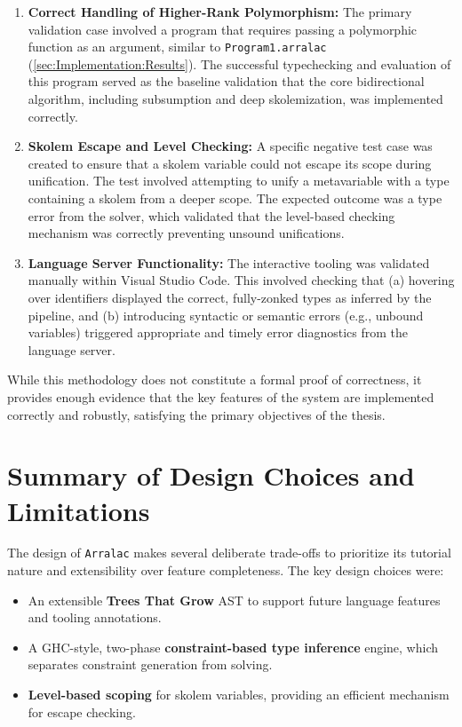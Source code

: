 \begin{enumerate}
    \item \textbf{Correct Handling of Higher-Rank Polymorphism:} The primary validation case involved a program that requires passing a polymorphic function as an argument, similar to \texttt{Program1.arralac} (\cref{sec:Implementation:Results}). The successful typechecking and evaluation of this program served as the baseline validation that the core bidirectional algorithm, including subsumption and deep skolemization, was implemented correctly.

    \item \textbf{Skolem Escape and Level Checking:} A specific negative test case was created to ensure that a skolem variable could not escape its scope during unification. The test involved attempting to unify a metavariable with a type containing a skolem from a deeper scope. The expected outcome was a type error from the solver, which validated that the level-based checking mechanism was correctly preventing unsound unifications.

    \item \textbf{Language Server Functionality:} The interactive tooling was validated manually within Visual Studio Code. This involved checking that (a) hovering over identifiers displayed the correct, fully-zonked types as inferred by the pipeline, and (b) introducing syntactic or semantic errors (e.g., unbound variables) triggered appropriate and timely error diagnostics from the language server.
\end{enumerate}

While this methodology does not constitute a formal proof of correctness, it provides enough evidence that the key features of the system are implemented correctly and robustly, satisfying the primary objectives of the thesis.

\section{Summary of Design Choices and Limitations}
\label{sec:Design:Summary}

The design of \texttt{Arralac} makes several deliberate trade-offs to prioritize its tutorial nature and extensibility over feature completeness. The key design choices were:
\begin{itemize}
    \item An extensible \textbf{Trees That Grow} AST to support future language features and tooling annotations.
    \item A GHC-style, two-phase \textbf{constraint-based type inference} engine, which separates constraint generation from solving.
    \item \textbf{Level-based scoping} for skolem variables, providing an efficient mechanism for escape checking.
\end{itemize}

